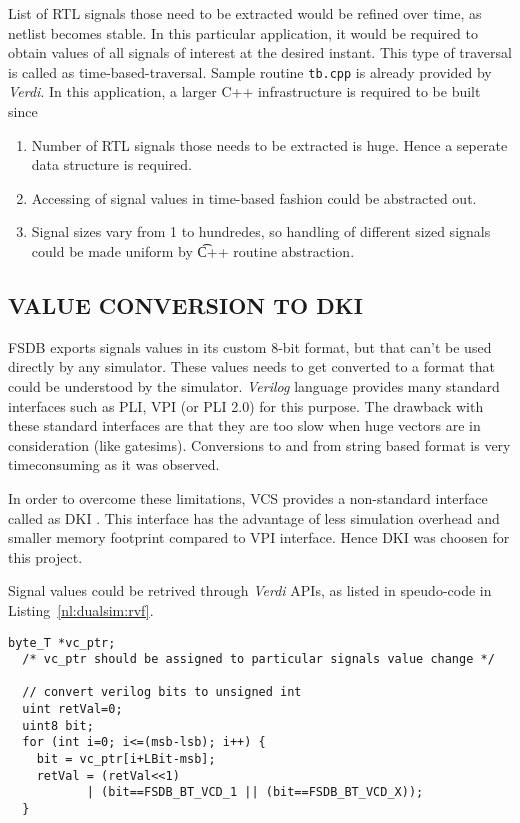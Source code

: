 List of RTL signals those need to be extracted would be refined over time, as netlist becomes stable. In this particular application, it would  be required  to obtain values of all signals of interest at the desired  instant. This type of traversal is called as time-based-traversal. Sample routine \texttt{tb.cpp}\cite[p.~28]{Verdi:FsdbReader} is already provided by {\it Verdi}. In this application, a larger C++ infrastructure is required to be built since
\begin{enumerate}
\item Number of RTL signals those needs to be extracted is huge. Hence a seperate data structure is required.
\item Accessing of signal values in time-based fashion could be abstracted out.
\item Signal sizes vary from 1 to hundredes, so handling of different sized signals could be made uniform by {\t C++} routine abstraction.
\end{enumerate}


\subsection{VALUE CONVERSION TO DKI}
FSDB exports signals values in its custom 8-bit format, but that can't be used directly by any simulator. These values needs to get converted to a format that could be understood by the simulator. {\it Verilog} language\cite{ieee:v:2005} provides many standard interfaces such as PLI, VPI (or PLI 2.0) for this purpose. The drawback with these standard interfaces are that they are too slow when huge vectors are in consideration (like gatesims). Conversions to and from string based format is very timeconsuming as it was observed.

In order to overcome these limitations, VCS provides a non-standard interface called as DKI . This interface has the advantage of less simulation overhead and smaller memory footprint compared to VPI interface. Hence DKI was choosen for this project.


Signal values could be retrived through {\it Verdi} APIs, as listed in speudo-code in Listing~\ref{nl:dualsim:rvf}.

\lstset{language=C++,
basicstyle=\footnotesize,
frame=shadowbox,
breaklines=true}          
\begin{lstlisting}[frame=single, caption=Retrieving Values from FSDB,label=nl:dualsim:rvf] 
  byte_T *vc_ptr;
  /* vc_ptr should be assigned to particular signals value change */

  // convert verilog bits to unsigned int
  uint retVal=0;
  uint8 bit;
  for (int i=0; i<=(msb-lsb); i++) {
    bit = vc_ptr[i+LBit-msb];
    retVal = (retVal<<1)
           | (bit==FSDB_BT_VCD_1 || (bit==FSDB_BT_VCD_X));
  }
\end{lstlisting}
\renewcommand{\lstlistingname}{Code}

